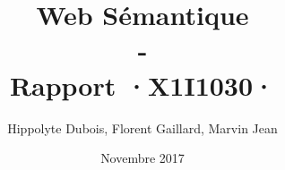 \documentclass{report}
\begin{document}

\title{Web Sémantique\\
        -\\
        \huge{Rapport}
        \vskip1cm
        ·X1I1030·
}
\vskip2cm
\author{Hippolyte Dubois, Florent Gaillard, Marvin Jean}
\date{Novembre 2017}

%

\maketitle
\tableofcontents\begin{flushright}
\end{flushright}



\end{document}
